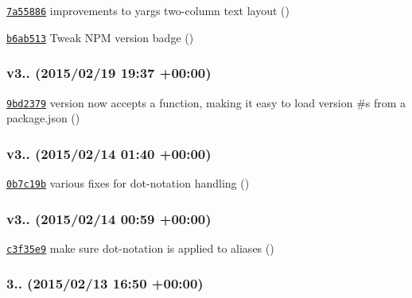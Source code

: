 \begin{DoxyItemize}
\item \href{https://github.com/bcoe/yargs/commit/7a55886c9343cf71a20744ca5cdd56d2ea7412d5}{\tt 7a55886} improvements to yargs two-\/column text layout ()
\item \href{https://github.com/bcoe/yargs/commit/b6ab5136a4c3fa6aa496f6b6360382e403183989}{\tt b6ab513} Tweak N\+PM version badge ()
\end{DoxyItemize}

\subsubsection*{v3.. (2015/02/19 19\+:37 +00\+:00)}


\begin{DoxyItemize}
\item \href{https://github.com/bcoe/yargs/commit/9bd237921cf1b61fd9f32c0e6d23f572fc225861}{\tt 9bd2379} version now accepts a function, making it easy to load version \#s from a package.\+json ()
\end{DoxyItemize}

\subsubsection*{v3.. (2015/02/14 01\+:40 +00\+:00)}


\begin{DoxyItemize}
\item \href{https://github.com/bcoe/yargs/commit/0b7c19beaecb747267ca4cc10e5cb2a8550bc4b7}{\tt 0b7c19b} various fixes for dot-\/notation handling ()
\end{DoxyItemize}

\subsubsection*{v3.. (2015/02/14 00\+:59 +00\+:00)}


\begin{DoxyItemize}
\item \href{https://github.com/bcoe/yargs/commit/c3f35e99bd5a0d278073fcadd95e2d778616cc17}{\tt c3f35e9} make sure dot-\/notation is applied to aliases ()
\end{DoxyItemize}

\subsubsection*{3.. (2015/02/13 16\+:50 +00\+:00)}


